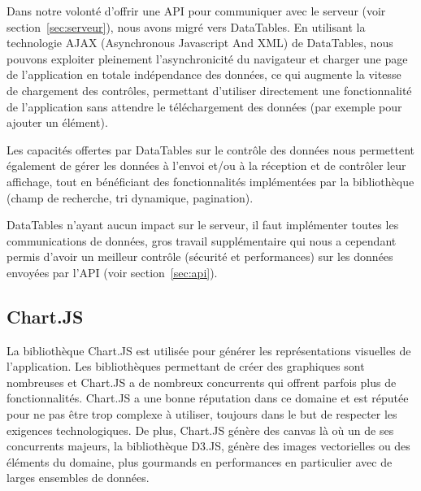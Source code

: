 \documentclass{EPL-master-thesis-covers-FR}
\begin{document}
				Dans notre volonté d'offrir une API pour communiquer avec le serveur (voir section~\ref{sec:serveur}), nous avons migré vers DataTables. En utilisant la technologie AJAX (Asynchronous Javascript And XML) de DataTables, nous pouvons exploiter pleinement l'asynchronicité du navigateur et charger une page de l'application en totale indépendance des données, ce qui augmente la vitesse de chargement des contrôles, permettant d'utiliser directement une fonctionnalité de l'application sans attendre le téléchargement des données (par exemple pour ajouter un élément).

				Les capacités offertes par DataTables sur le contrôle des données nous permettent également de gérer les données à l'envoi et/ou à la réception et de contrôler leur affichage, tout en bénéficiant des fonctionnalités implémentées par la bibliothèque (champ de recherche, tri dynamique, pagination).

				DataTables n'ayant aucun impact sur le serveur, il faut implémenter toutes les communications de données, gros travail supplémentaire qui nous a cependant permis d'avoir un meilleur contrôle (sécurité et performances) sur les données envoyées par l'API (voir section~\ref{sec:api}).


			\subsection*{Chart.JS}

				La bibliothèque Chart.JS est utilisée pour générer les représentations visuelles de l'application. Les bibliothèques permettant de créer des graphiques sont nombreuses et Chart.JS a de nombreux concurrents qui offrent parfois plus de fonctionnalités. Chart.JS a une bonne réputation dans ce domaine et est réputée pour ne pas être trop complexe à utiliser, toujours dans le but de respecter les exigences technologiques.
				De plus, Chart.JS génère des canvas là où un de ses concurrents majeurs, la bibliothèque D3.JS, génère des images vectorielles ou des éléments du domaine, plus gourmands en performances en particulier avec de larges ensembles de données.
\end{document}
